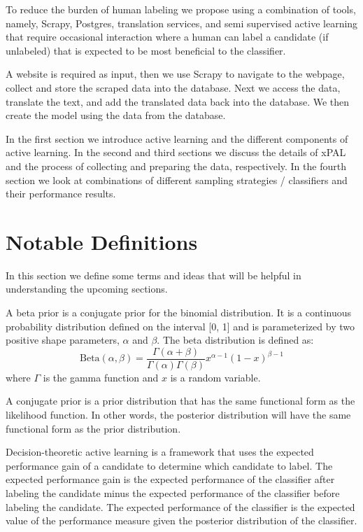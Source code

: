 To reduce the burden of human labeling we propose using a combination of tools, namely, Scrapy, Postgres, translation services, and semi supervised active learning that require occasional interaction where a human can label a candidate (if unlabeled) that is expected to be most beneficial to the classifier. 

A website is required as input, then we use Scrapy to navigate to the webpage, collect and store the scraped data into the database. Next we access the data, translate the text, and add the translated data back into the database. We then create the model using the data from the database. 

In the first section we introduce active learning and the different components of active learning. In the second and third sections we discuss the details of xPAL and the process of collecting and preparing the data, respectively. In the fourth section we look at combinations of different sampling strategies / classifiers and their performance results.

\section*{Notable Definitions}

In this section we define some terms and ideas that will be helpful in understanding the upcoming sections.

\begin{defn}
\label{def:beta_prior}
A beta prior is a conjugate prior for the binomial distribution. It is a continuous probability distribution defined on the interval [0, 1] and is parameterized by two positive shape parameters, \(\alpha\) and \(\beta\). The beta distribution is defined as: 
\[\text{Beta}(\alpha, \beta) = \frac{\Gamma(\alpha + \beta)}{\Gamma(\alpha)\Gamma(\beta)}x^{\alpha - 1}(1 - x)^{\beta - 1}\]
where \(\Gamma\) is the gamma function and \(x\) is a random variable.
\end{defn}

\begin{defn}
\label{def:conjugate_prior}
A conjugate prior is a prior distribution that has the same functional form as the likelihood function. In other words, the posterior distribution will have the same functional form as the prior distribution.
\end{defn}

\begin{defn}
\label{def:decision_theoretic}
Decision-theoretic active learning is a framework that uses the expected performance gain of a candidate to determine which candidate to label. The expected performance gain is the expected performance of the classifier after labeling the candidate minus the expected performance of the classifier before labeling the candidate. The expected performance of the classifier is the expected value of the performance measure given the posterior distribution of the classifier.
\end{defn}

